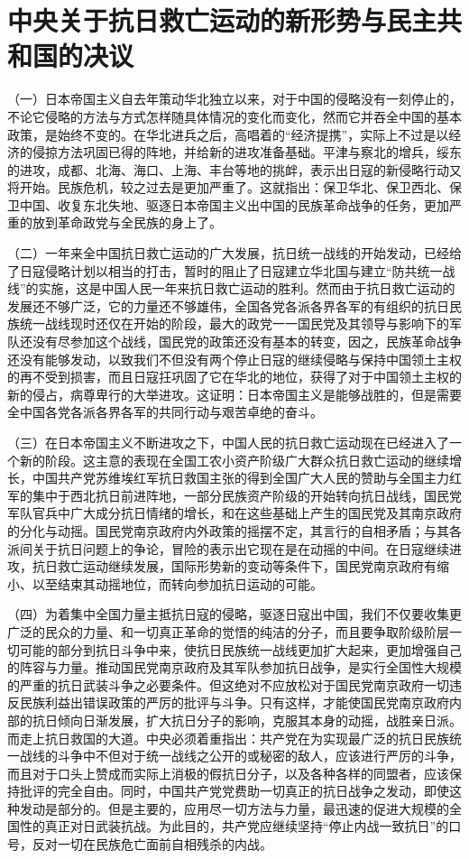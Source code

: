 \section[中央关于抗日救亡运动的新形势与民主共和国的决议（一九三六年九月十七日）]{中央关于抗日救亡运动的新形势与民主共和国的决议}


（一）日本帝国主义自去年策动华北独立以来，对于中国的侵略没有一刻停止的，不论它侵略的方法与方式怎样随具体情况的变化而变化，然而它并吞全中国的基本政策，是始终不变的。在华北进兵之后，高唱着的“经济提携”，实际上不过是以经济的侵掠方法巩固已得的阵地，并给新的进攻准备基础。平津与察北的增兵，绥东的进攻，成都、北海、海口、上海、丰台等地的挑衅，表示出日寇的新侵略行动又将开始。民族危机，较之过去是更加严重了。这就指出：保卫华北、保卫西北、保卫中国、收复东北失地、驱逐日本帝国主义出中国的民族革命战争的任务，更加严重的放到革命政党与全民族的身上了。

（二）一年来全中国抗日救亡运动的广大发展，抗日统一战线的开始发动，已经给了日寇侵略计划以相当的打击，暂时的阻止了日寇建立华北国与建立“防共统一战线”的实施，这是中国人民一年来抗日救亡运动的胜利。然而由于抗日救亡运动的发展还不够广泛，它的力量还不够雄伟，全国各党各派各界各军的有组织的抗日民族统一战线现时还仅在开始的阶段，最大的政党一一国民党及其领导与影响下的军队还没有尽参加这个战线，国民党的政策还没有基本的转变，因之，民族革命战争还没有能够发动，以致我们不但没有两个停止日寇的继续侵略与保持中国领土主权的再不受到损害，而且日寇抂巩固了它在华北的地位，获得了对于中国领土主权的新的侵占，病尊卑行的大举进攻。这证明：日本帝国主义是能够战胜的，但是需要全中国各党各派各界各军的共同行动与艰苦卓绝的奋斗。

（三）在日本帝国主义不断进攻之下，中国人民的抗日救亡运动现在已经进入了一个新的阶段。这主意的表现在全国工农小资产阶级广大群众抗日救亡运动的继续增长，中国共产党苏维埃红军抗日救国主张的得到全国广大人民的赞助与全国主力红军的集中于西北抗日前进阵地，一部分民族资产阶级的开始转向抗日战线，国民党军队官兵中广大成分抗日情绪的增长，和在这些基础上产生的国民党及其南京政府的分化与动摇。国民党南京政府内外政策的摇摆不定，其言行的自相矛盾；与其各派间关于抗日问题上的争论，冒险的表示出它现在是在动摇的中间。在日寇继续进攻，抗日救亡运动继续发展，国际形势新的变动等条件下，国民党南京政府有缩小、以至结束其动摇地位，而转向参加抗日运动的可能。

（四）为着集中全国力量主抵抗日寇的侵略，驱逐日寇出中国，我们不仅要收集更广泛的民众的力量、和一切真正革命的觉悟的纯洁的分子，而且要争取阶级阶层一切可能的部分到抗日斗争中来，使抗日民族统一战线更加扩大起来，更加增强自己的阵容与力量。推动国民党南京政府及其军队参加抗日战争，是实行全国性大规模的严重的抗日武装斗争之必要条件。但这绝对不应放松对于国民党南京政府一切违反民族利益出错误政策的严厉的批评与斗争。只有这样，才能使国民党南京政府内部的抗日倾向日渐发展，扩大抗日分子的影响，克服其本身的动摇，战胜亲日派。而走上抗日救国的大道。中央必须着重指出：共产党在为实现最广泛的抗日民族统一战线的斗争中不但对于统一战线之公开的或秘密的敌人，应该进行严厉的斗争，而且对于口头上赞成而实际上消极的假抗日分子，以及各种各样的同盟者，应该保持批评的完全自由。同时，中国共产党党费助一切真正的抗日战争之发动，即使这种发动是部分的。但是主要的，应用尽一切方法与力量，最迅速的促进大规模的全国性的真正对日武装抗战。为此目的，共产党应继续坚持“停止内战一致抗日”的口号，反对一切在民族危亡面前自相残杀的内战。


